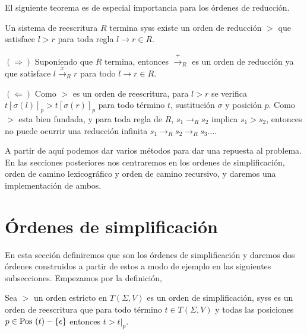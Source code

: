 
El siguiente teorema es de especial importancia para los órdenes de
reducción.

\begin{teor} 
  Un sistema de reescritura $R$ termina syss existe un orden de
  reducción $>$ que satisface $l>r$ para toda regla
  $l \rightarrow r \in R$.
\end{teor}

\begin{demo}
  $(\Rightarrow)$ Suponiendo que $R$ termina, entonces
  $\xrightarrow{+}_R$ es un orden de reducción ya que satisface
  $l \xrightarrow{x}_R r$ para todo $l \rightarrow r \in R$.

  $(\Leftarrow)$ Como $>$ es un orden de reescritura, para $l > r$ se
  verifica $t [ \sigma(l) ]_p > t [ \sigma(r) ]_p$ para todo
  término $t$, sustitución $\sigma$ y posición $p$. Como $>$ esta bien
  fundada, y para toda regla de $R$, $s_1 \rightarrow_R s_2$ implica
  $s_1 > s_2$, entonces no puede ocurrir una reducción infinita
  $s_1 \rightarrow_R s_2 \rightarrow_R s_3 \dots$.
\end{demo}


A partir de aquí podemos dar varios métodos para dar una repuesta al
problema. En las secciones posteriores nos centraremos en los ordenes
de simplificación, orden de camino lexicográfico y orden de camino
recursivo, y daremos una implementación de ambos.

\section{Órdenes de simplificación}

En esta sección definiremos que son los órdenes de simplificación y
daremos dos órdenes construidos a partir de estos a modo de ejemplo en
las siguientes subsecciones. Empezamos por la definición,

\begin{defi}
  Sea $>$ un orden estricto en $T(\Sigma, V)$ es un orden de
  simplificación, syss es un orden de reescritura que para todo
  término $t \in T(\Sigma, V)$ y todas las posiciones
  $p \in \mbox{Pos }(t) - \{ \epsilon \}$ entonces $t > t|_p$.
\end{defi}

